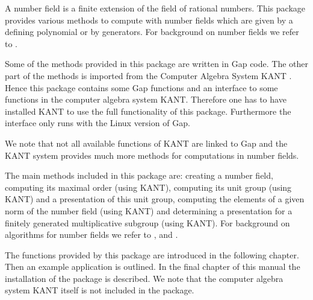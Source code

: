 

A number field is a finite extension of the field of rational numbers. 
This package provides various methods to compute with number fields
which are given by a defining polynomial or by generators. For background 
on number fields we refer to \cite{Sta79}.

Some of the methods provided in this package are written in Gap code.
The other part of the methods is imported from the Computer Algebra 
System KANT \cite{Kant}. Hence this package contains some Gap functions 
and an interface to some functions in the computer algebra system
KANT. Therefore one has to have installed KANT to use the full functionality
of this package. Furthermore the interface only runs with the Linux version of
Gap.

We note that not all available functions of KANT are linked to Gap and
the KANT system provides much more methods for computations in number
fields. 

The main methods included in this package are: creating a number field, 
computing its maximal order (using KANT), computing its unit group (using 
KANT) and a presentation of this unit group, computing the elements of a
given norm of the number field (using KANT) and determining a presentation
for a finitely generated multiplicative subgroup (using KANT). For background
on algorithms for number fields we refer to \cite{Poh93}, \cite{PZa89} and
\cite{Coh93}.

The functions provided by this package are introduced in the following
chapter. Then an example application is outlined. In the final chapter
of this manual the installation of the package is described. We note
that the computer algebra system KANT itself is not included in the package. 

